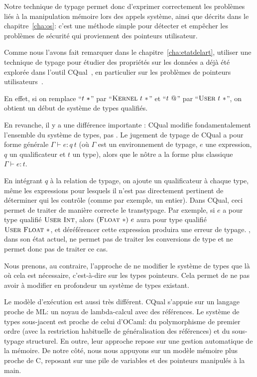 Notre technique de typage permet donc d'exprimer correctement les problèmes liés
à la manipulation mémoire lors des appels système, ainsi que décrits dans le
chapitre~\ref{cha:os}: c'est une méthode simple pour détecter et empêcher les
problèmes de sécurité qui proviennent des pointeurs utilisateur.

Comme nous l'avons fait remarquer dans le chapitre~\ref{cha:etatdelart},
utiliser une technique de typage pour étudier des propriétés sur les données a
déjà été explorée dans l'outil CQual~\cite{pldi99}, en particulier sur les
problèmes de pointeurs utilisateurs~\cite{cquk-usenix04}.

En effet, si on remplace \enquote{$t~*$} par \enquote{$\textsc{Kernel}~t~*$} et
\enquote{$t~@$} par \enquote{$\textsc{User}~t~*$}, on obtient un début de système
de types qualifiés.

En revanche, il y a une différence importante : CQual modifie fondamentalement
l'ensemble du système de types, pas \langname. Le jugement de typage de CQual a
pour forme générale $Γ ⊢ e : q~t$ (où $Γ$ est un environnement de typage, $e$
une expression, $q$ un qualificateur et $t$ un type), alors que le nôtre a la
forme plus classique $Γ ⊢ e : t$.

En intégrant $q$ à la relation de typage, on ajoute un qualificateur à chaque
type, même les expressions pour lesquels il n'est pas directement pertinent de
déterminer qui les contrôle (comme par exemple, un entier). Dans CQual, ceci
permet de traiter de manière correcte le transtypage. Par exemple, si $e$ a pour
type qualifié $\textsc{User}~\textsc{Int}$, alors $(\textsc{Float}~*)~e$ aura pour type qualifié
$\textsc{User}~\textsc{Float}~*$, et déréférencer cette expression produira une erreur de
typage. \langname, dans son état actuel, ne permet pas de traiter les
conversions de type et ne permet donc pas de traiter ce cas.


Nous prenons, au contraire, l'approche de ne modifier le système de types que là
où cela est nécessaire, c'est-à-dire sur les types pointeurs. Cela permet de ne
pas avoir à modifier en profondeur un système de types existant.

Le modèle d'exécution est aussi très différent. CQual s'appuie sur un langage
proche de ML: un noyau de lambda-calcul avec des références. Le système de types
sous-jacent est proche de celui d'OCaml: du polymorphisme de premier ordre (avec
la restriction habituelle de généralisation des références) et du sous-typage
structurel. En outre, leur approche repose sur une gestion automatique de la
mémoire. De notre côté, nous nous appuyons sur un modèle mémoire plus proche de
C, reposant sur une pile de variables et des pointeurs manipulés à la main.

